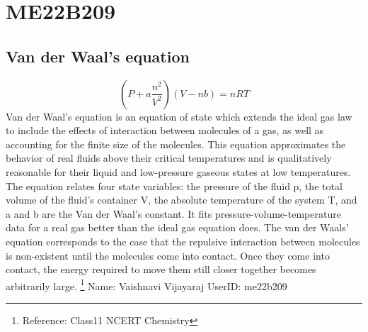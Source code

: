 \section{ME22B209}
\subsection{Van der Waal's equation}
\begin{equation}
(P+a\frac{n^2}{V^2})(V-nb)=nRT
\end{equation}
Van der Waal's equation is an equation of state which extends the ideal gas law to include the effects of interaction between molecules of a gas, as well as accounting for the finite size of the molecules.
This equation approximates the behavior of real fluids above their critical temperatures and is qualitatively reasonable for their liquid and low-pressure gaseous states at low temperatures.
The equation relates four state variables: the pressure of the fluid p, the total volume of the fluid's container V, the absolute temperature of the system T, and a and b are the Van der Waal's constant.
It fits pressure-volume-temperature data for a real gas better than the ideal gas equation does.
The van der Waals’ equation corresponds to the case that the repulsive interaction between molecules is non-existent until the molecules come into contact. 
Once they come into contact, the energy required to move them still closer together becomes arbitrarily large.
\footnote{Reference: Class11 NCERT Chemistry}
Name: Vaishnavi Vijayaraj
UserID: me22b209
